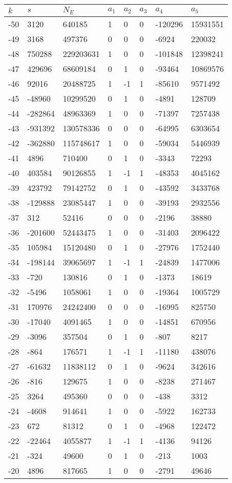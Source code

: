 \documentclass{amsart}
\begin{document}
\begin{longtable}{|l|l|l|lllll|}
\hline
$k$ & $s$ & $N_E$ & $a_1$ & $a_2$ & $a_3$ & $a_4$ & $a_5$\\
\hline
-50&3120&640185&1&0&0&-120296&15931551\\
-49&3168&497376&0&0&0&-6924&220032\\
-48&750288&229203631&1&0&0&-101848&12398241\\
-47&429696&68609184&0&1&0&-93464&10869576\\
-46&92016&20488725&1&-1&1&-85610&9571492\\
-45&-48960&10299520&0&1&0&-4891&128709\\
-44&-282864&48963369&1&0&0&-71397&7257438\\
-43&-931392&130578336&0&0&0&-64995&6303654\\
-42&-362880&115748617&1&0&0&-59034&5446939\\
-41&4896&710400&0&1&0&-3343&72293\\
-40&403584&90126855&1&-1&1&-48353&4045162\\
-39&423792&79142752&0&1&0&-43592&3433768\\
-38&-129888&23085447&1&0&0&-39193&2932556\\
-37&312&52416&0&0&0&-2196&38880\\
-36&-201600&52443475&1&0&0&-31403&2096422\\
-35&105984&15120480&0&1&0&-27976&1752440\\
-34&-198144&39065697&1&-1&1&-24839&1477006\\
-33&-720&130816&0&1&0&-1373&18619\\
-32&-5496&1058061&1&0&0&-19364&1005729\\
-31&170976&24242400&0&0&0&-16995&825750\\
-30&-17040&4091465&1&0&0&-14851&670956\\
-29&-3096&357504&0&1&0&-807&8217\\
-28&-864&176571&1&-1&1&-11180&438076\\
-27&-61632&11838112&0&1&0&-9624&342616\\
-26&-816&129675&1&0&0&-8238&271467\\
-25&3264&495360&0&0&0&-438&3312\\
-24&-4608&914641&1&0&0&-5922&162733\\
-23&672&81312&0&1&0&-4968&122472\\
-22&-22464&4055877&1&-1&1&-4136&94126\\
-21&-324&49600&0&1&0&-213&1003\\
-20&4896&817665&1&0&0&-2791&49646\\

\end{longtable}
\end{document}
